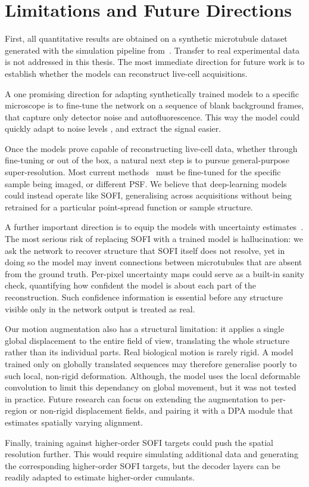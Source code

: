 \section{Limitations and Future Directions}
\label{sec:limitations}

First, all quantitative results are obtained on a synthetic microtubule dataset
generated with the simulation pipeline from~\cite{resurf2024}. Transfer to real
experimental data is not addressed in this thesis. The most immediate direction for
future work is to establish whether the models can reconstruct live-cell acquisitions.

A one promising direction for adapting synthetically trained models to a specific
microscope is to fine-tune the network on a sequence of blank background frames, 
that capture only detector noise and autofluorescence. This way the model could 
quickly adapt to noise levels \cite{noise2noise2018}, and extract the signal easier. 

Once the models prove capable of reconstructing live-cell data, whether through
fine-tuning or out of the box, a natural next step is to pursue general-purpose
super-resolution. Most current methods~\cite{qiao2025dpatisr,resurf2024} must be fine-tuned
for the specific sample being imaged, or different PSF. We believe that deep-learning models could instead
operate like SOFI, generalising across acquisitions without being retrained for a particular
point-spread function or sample structure.


A further important direction is to equip the models with uncertainty estimates~\cite{qiao2025dpatisr}.
The most serious risk of replacing SOFI with a trained model is hallucination: we ask the network
to recover structure that SOFI itself does not resolve, yet in doing so the model may invent
connections between microtubules that are absent from the ground truth. Per-pixel uncertainty maps
could serve as a built-in sanity check, quantifying how confident the model is about each part of
the reconstruction. Such confidence information is essential before any structure visible only in
the network output is treated as real.

Our motion augmentation also has a structural limitation: it applies a single global
displacement to the entire field of view, translating the whole structure rather than its
individual parts. Real biological motion is rarely rigid. A model trained only on globally translated
sequences may therefore generalise poorly to such local, non-rigid deformation. Although, the model 
uses the local deformable convolution to limit this dependancy on global movement,
 but it was not tested in practice. 
Future research can focus on extending the augmentation to per-region or non-rigid displacement fields, 
and pairing it with a DPA module that estimates spatially varying alignment.

Finally, training against higher-order SOFI targets could push the spatial resolution further.
This would require simulating additional data and generating the corresponding higher-order
SOFI targets, but the decoder layers can be readily adapted to estimate higher-order cumulants.
